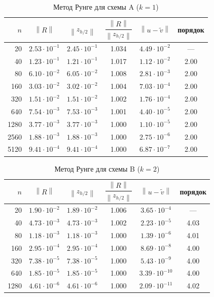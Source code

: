 \documentclass[12pt,a4paper]{article}
\newcommand{\norm}[1]{\left\|#1\right\|}
\begin{document}
\begin{table}[htbp]
\caption{Метод Рунге для схемы A ($k=1$)}
\label{tab:runge1}
\centering
\begin{tabular}{r c c c c c}
\toprule
$n$ & $\norm{R}$ & $\norm{z_{h/2}}$ &
$\dfrac{\norm{R}}{\norm{z_{h/2}}}$ & $\norm{u-\tilde v}$ &
порядок\\
\midrule
20 & $2.53\cdot10^{-1}$ & $2.45\cdot10^{-1}$ & 1.034 & $4.49\cdot10^{-2}$ & --- \\
40 & $1.23\cdot10^{-1}$ & $1.21\cdot10^{-1}$ & 1.017 & $1.12\cdot10^{-2}$ & 2.00 \\
80 & $6.10\cdot10^{-2}$ & $6.05\cdot10^{-2}$ & 1.008 & $2.81\cdot10^{-3}$ & 2.00 \\
160 & $3.03\cdot10^{-2}$ & $3.02\cdot10^{-2}$ & 1.004 & $7.03\cdot10^{-4}$ & 2.00 \\
320 & $1.51\cdot10^{-2}$ & $1.51\cdot10^{-2}$ & 1.002 & $1.76\cdot10^{-4}$ & 2.00 \\
640 & $7.54\cdot10^{-3}$ & $7.53\cdot10^{-3}$ & 1.001 & $4.40\cdot10^{-5}$ & 2.00 \\
1280 & $3.77\cdot10^{-3}$ & $3.77\cdot10^{-3}$ & 1.000 & $1.10\cdot10^{-5}$ & 2.00 \\
2560 & $1.88\cdot10^{-3}$ & $1.88\cdot10^{-3}$ & 1.000 & $2.75\cdot10^{-6}$ & 2.00 \\
5120 & $9.41\cdot10^{-4}$ & $9.41\cdot10^{-4}$ & 1.000 & $6.87\cdot10^{-7}$ & 2.00 \\
\bottomrule
\end{tabular}
\end{table}

\begin{table}[htbp]
\caption{Метод Рунге для схемы B ($k=2$)}
\label{tab:runge2}
\centering
\begin{tabular}{r c c c c c}
\toprule
$n$ & $\norm{R}$ & $\norm{z_{h/2}}$ &
$\dfrac{\norm{R}}{\norm{z_{h/2}}}$ & $\norm{u-\tilde v}$ &
порядок\\
\midrule
20 & $1.90\cdot10^{-2}$ & $1.89\cdot10^{-2}$ & 1.006 & $3.65\cdot10^{-4}$ & --- \\
40 & $4.73\cdot10^{-3}$ & $4.73\cdot10^{-3}$ & 1.002 & $2.23\cdot10^{-5}$ & 4.03 \\
80 & $1.18\cdot10^{-3}$ & $1.18\cdot10^{-3}$ & 1.000 & $1.39\cdot10^{-6}$ & 4.01 \\
160 & $2.95\cdot10^{-4}$ & $2.95\cdot10^{-4}$ & 1.000 & $8.69\cdot10^{-8}$ & 4.00 \\
320 & $7.38\cdot10^{-5}$ & $7.38\cdot10^{-5}$ & 1.000 & $5.43\cdot10^{-9}$ & 4.00 \\
640 & $1.85\cdot10^{-5}$ & $1.85\cdot10^{-5}$ & 1.000 & $3.39\cdot10^{-10}$ & 4.00 \\
1280 & $4.61\cdot10^{-6}$ & $4.61\cdot10^{-6}$ & 1.000 & $2.09\cdot10^{-11}$ & 4.02 \\
\bottomrule
\end{tabular}
\end{table}
\end{document}
